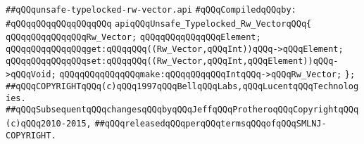 \label{src/lib/std/src/unsafe/unsafe-typelocked-rw-vector.api}
\verb|##qQQqunsafe-typelocked-rw-vector.api|\newline
\newline
\verb|#qQQqCompiledqQQqby:|\newline
\verb|#qQQqqQQqqQQqqQQqqQQq|\newline
\newline
\newline
\newline
\verb|apiqQQqUnsafe_Typelocked_Rw_VectorqQQq{|\newline
\newline
\verb|qQQqqQQqqQQqqQQqRw_Vector;|\newline
\verb|qQQqqQQqqQQqqQQqElement;|\newline
\newline
\verb|qQQqqQQqqQQqqQQqget:qQQqqQQq((Rw_Vector,qQQqInt))qQQq->qQQqElement;|\newline
\verb|qQQqqQQqqQQqqQQqset:qQQqqQQq((Rw_Vector,qQQqInt,qQQqElement))qQQq->qQQqVoid;|\newline
\verb|qQQqqQQqqQQqqQQqmake:qQQqqQQqqQQqIntqQQq->qQQqRw_Vector;|\newline
\verb|};|\newline
\newline
\newline
\newline
\newline
\verb|##qQQqCOPYRIGHTqQQq(c)qQQq1997qQQqBellqQQqLabs,qQQqLucentqQQqTechnologies.|\newline
\verb|##qQQqSubsequentqQQqchangesqQQqbyqQQqJeffqQQqProtheroqQQqCopyrightqQQq(c)qQQq2010-2015,|\newline
\verb|##qQQqreleasedqQQqperqQQqtermsqQQqofqQQqSMLNJ-COPYRIGHT.|\newline

